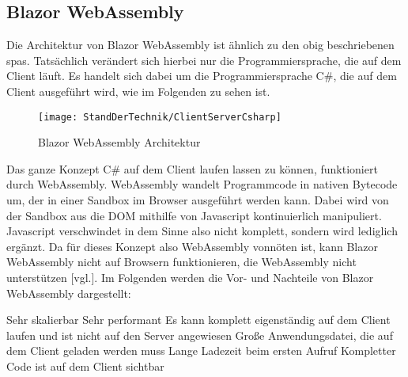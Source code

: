 \subsection{Blazor WebAssembly}
Die Architektur von Blazor WebAssembly ist ähnlich zu den obig beschriebenen \ac{spa}s. Tatsächlich
verändert sich hierbei nur die Programmiersprache, die auf dem
Client läuft. Es handelt sich dabei um die Programmiersprache C\#, die auf dem Client
ausgeführt wird, wie im Folgenden zu sehen ist.
\begin{figure}[h]
    \centering
    \texttt{[image: StandDerTechnik/ClientServerCsharp]}
    \caption[Blazor WebAssembly Architektur]{Blazor WebAssembly Architektur}
    \label{img:clientservercsharp}
\end{figure}
\newline
\newline
Das ganze Konzept C\# auf dem Client laufen lassen zu können, funktioniert durch
WebAssembly. WebAssembly wandelt Programmcode in nativen Bytecode um, der in einer Sandbox
im Browser ausgeführt werden kann. Dabei wird von der Sandbox aus die DOM mithilfe von
Javascript kontinuierlich manipuliert. Javascript verschwindet in dem Sinne also nicht komplett,
sondern wird lediglich ergänzt.
Da für dieses Konzept also WebAssembly vonnöten ist, kann Blazor WebAssembly nicht auf Browsern
funktionieren, die WebAssembly nicht unterstützen \cite{HierKommtBlazor}[vgl.].
\newline
\newline
Im Folgenden werden die Vor- und Nachteile von Blazor WebAssembly dargestellt:
\begin{itemize}
    \pro Sehr skalierbar
    \pro Sehr performant
    \pro Es kann komplett eigenständig auf dem Client laufen und ist nicht auf den
    Server angewiesen
    \con Große Anwendungsdatei, die auf dem Client geladen werden muss
    \con Lange Ladezeit beim ersten Aufruf
    \con Kompletter Code ist auf dem Client sichtbar
\end{itemize}

